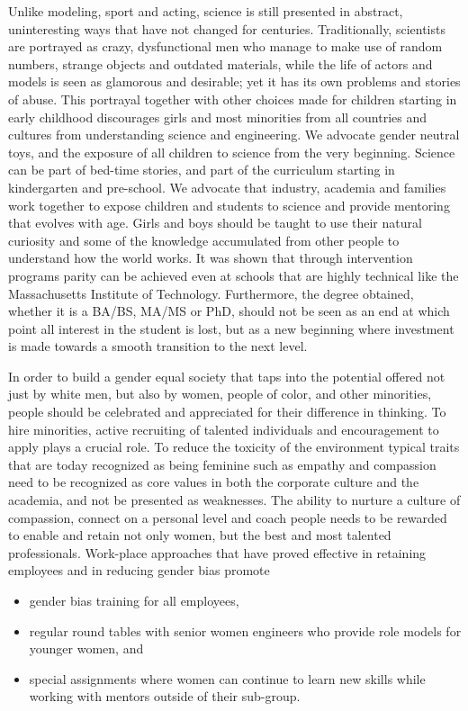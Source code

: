\documentclass[utf8]{frontiersSCNS} %
\begin{document}
Unlike modeling, sport and acting, science is still presented in abstract, uninteresting ways that have not changed for centuries.  Traditionally, scientists are portrayed as crazy, dysfunctional men who manage to make use of random numbers, strange objects and outdated materials, while the life of actors and models is seen as glamorous and desirable; yet it has its own problems and stories of abuse.   This portrayal together with other choices made for children starting in early childhood discourages girls and most minorities from all countries and cultures from understanding science and engineering. We advocate gender neutral toys, and the exposure of all children to science from the very beginning.  Science can be part of bed-time stories, and part of the curriculum starting in kindergarten and pre-school. We advocate that industry, academia and families work together to expose children and students to science and provide mentoring that evolves with age. Girls and boys should be taught to use their natural curiosity and some of the knowledge accumulated from other people to understand how the world works. It was shown that through intervention programs parity can be achieved even at schools that are highly technical like the Massachusetts Institute of Technology. Furthermore, the degree obtained, whether it is a BA/BS, MA/MS or PhD, should not be seen as an end at which point all interest in the student is lost, but as a new beginning where investment is made towards a smooth transition to the next level. 

In order to build a gender equal society that taps into the potential offered not just by white men, but also by women, people of color, and other minorities, people should be celebrated and appreciated for their difference in thinking. To hire minorities, active recruiting of talented individuals and encouragement to apply plays a crucial role. To reduce the toxicity of the environment typical traits that are today recognized as being feminine such as empathy and compassion need to be recognized as core values in both the corporate culture and the academia, and not be presented as weaknesses. The ability to nurture a culture of compassion, connect on a personal level and coach people needs to be rewarded to enable and retain not only women, but the best and most talented professionals. Work-place approaches that have proved effective in retaining employees and in reducing gender bias promote
\begin{itemize}
\item gender bias training for all employees,
\item regular round tables with senior women engineers who provide role models for younger women, and 
\item special assignments where women can continue to learn new skills while working with mentors outside of their sub-group. 
\end{itemize}
\end{document}

